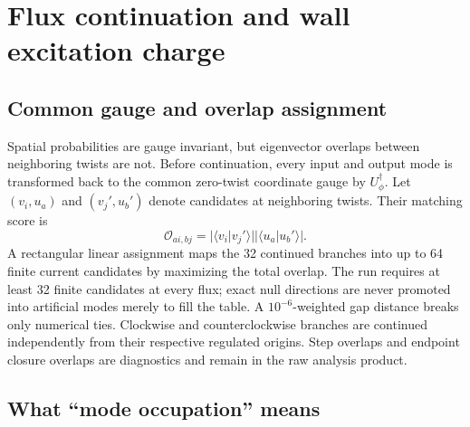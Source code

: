 \documentclass[aps,prb,twocolumn,floatfix,nofootinbib,superscriptaddress]{revtex4-2}
\begin{document}
\section{Flux continuation and wall excitation charge}

\subsection{Common gauge and overlap assignment}

Spatial probabilities are gauge invariant, but eigenvector overlaps between
neighboring twists are not.  Before continuation, every input and output mode
is transformed back to the common zero-twist coordinate gauge by
$U_\phi^\dagger$.  Let $(v_i,u_a)$ and $(v_j',u_b')$ denote candidates at
neighboring twists.  Their matching score is
\begin{equation}
 \mathcal O_{ai,bj}
 =\bigl\lvert\langle v_i\vert v_j'\rangle\bigr\rvert
  \bigl\lvert\langle u_a\vert u_b'\rangle\bigr\rvert.
 \label{eq:mode-overlap}
\end{equation}
A rectangular linear assignment maps the 32 continued branches into up to 64
finite current candidates by maximizing the total overlap.  The run requires
at least 32 finite candidates at every flux; exact null directions are never
promoted into artificial modes merely to fill the table.  A $10^{-6}$-weighted gap
distance breaks only numerical ties.  Clockwise and counterclockwise branches
are continued independently from their respective regulated origins.  Step
overlaps and endpoint closure overlaps are diagnostics and remain in the raw
analysis product.

\subsection{What ``mode occupation'' means}
\end{document}
